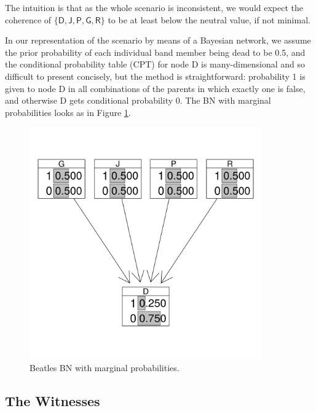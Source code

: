 \documentclass[10pt,]{scrartcl}
\begin{document}
The intuition is that as the whole scenario is inconsistent, we would expect the coherence of  $\{\mathsf{D,J,P,G,R}\}$ to be at least below the neutral value, if not minimal.


In our representation of the scenario by means of a Bayesian network,  we assume the prior probability of each individual band member being
dead to be 0.5, and the conditional probability table (CPT) for node \textsf{D} is
many-dimensional and so difficult to present concisely, but the method
is straightforward: probability 1 is given to node \textsf{D} in all
combinations of the parents in which exactly one is false, and otherwise
\textsf{D} gets conditional probability 0. The BN with marginal probabilities looks as in Figure \ref{fig:BeatlesBN3}.





\begin{figure}[H]
\centering
\includegraphics[width =10cm]{../images/BeatlesBN.png}
\caption{Beatles BN with marginal probabilities.}
\label{fig:BeatlesBN3}
\end{figure}




\subsection{The Witnesses}
\end{document}
